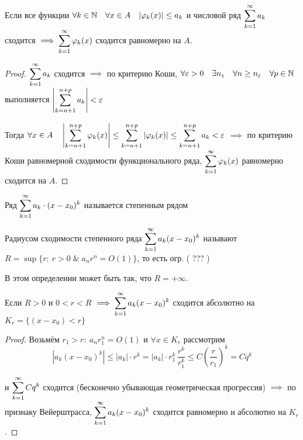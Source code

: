 \begin{theorem}
    Если все функции 
    $\forall k \in \mathbb{N} \quad \forall x \in A \quad |\varphi_k(x)| \leq a_k$ 
    и числовой ряд $\displaystyle\sum_{k=1}^\infty a_k$ сходится $\implies \displaystyle\sum_{k=1}^\infty \varphi_k(x)$
    сходится равномерно на $A$.
\end{theorem}
\begin{proof}
    $\displaystyle\sum_{k=1}^\infty a_k$ сходится $\implies$ по критерию Коши, $\forall \varepsilon > 0
    \quad \exists n_\varepsilon \quad \forall n \geq n_\varepsilon \quad
    \forall p \in \mathbb{N}$ выполняется $\left| \displaystyle\sum_{k=n+1}^{n+p} a_k \right| < \varepsilon$

    Тогда $\forall x \in A \quad \left| \displaystyle\sum_{k=n+1}^{n+p} \varphi_k(x) \right|
    \leq \displaystyle\sum_{k=n+1}^{n+p} |\varphi_k(x)|
    \leq \displaystyle\sum_{k=n+1}^{n+p} a_k < \varepsilon$
    $\implies$ по критерию Коши равномерной сходимости функционального ряда,
    $\displaystyle\sum_{k=1}^\infty \varphi_k(x)$ равномерно сходится на $A$.
\end{proof}

\begin{definition}
    Ряд $\displaystyle\sum_{k=1}^\infty a_k \cdot (x - x_0)^k$ называется степенным рядом
\end{definition}

\begin{definition}
    Радиусом сходимости степенного ряда $\displaystyle\sum_{k=1}^\infty a_k (x - x_0)^k$ называют
    $R = \sup \{ r: \: r > 0 \; \& \; a_n r^n = O(1) \}$, то есть огр. ( ??? )

    В этом определении может быть так, что $R = +\infty$.
\end{definition}

\begin{theorem}
    Если $R > 0$ и $0 < r < R$ $\implies \displaystyle\sum_{k=1}^\infty a_k (x - x_0)^k$ сходится
    абсолютно на $K_r = \{ (x - x_0) < r \}$
\end{theorem}
\begin{proof}
    Возьмём $r_1 > r: \: a_n r_1^n = O(1)$ и $\forall x \in K_r$ рассмотрим
    \[ 
        |a_k (x - x_0)^k| \leq |a_k| \cdot r^k
        = |a_k| \cdot r_1^k \, \frac{r^k}{r_1^k}
        \leq C \left( \frac{r}{r_1} \right)^k = C q^k
    \]

     и $\displaystyle\sum_{k=1}^\infty C q^k$ сходится (бесконечно убывающая геометрическая прогрессия)
    $\implies$ по признаку Вейерштрасса, $\displaystyle\sum_{k=1}^\infty a_k (x - x_0)^k$ сходится
    равномерно и абсолютно на $K_r$.
\end{proof}


